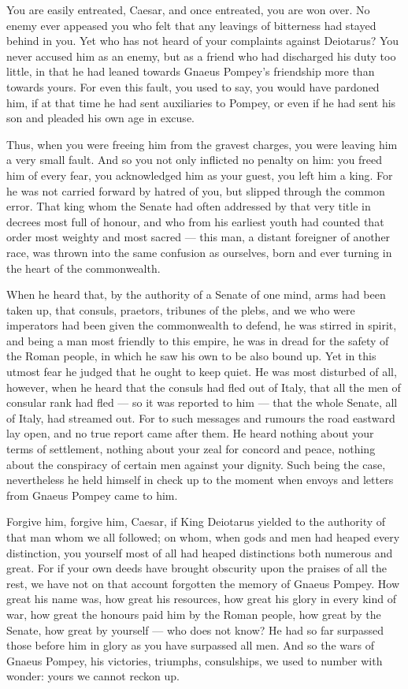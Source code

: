  You are easily entreated, Caesar, and once entreated, you are won over. No enemy ever appeased you who felt that any leavings of bitterness had stayed behind in you. Yet who has not heard of your complaints against Deiotarus? You never accused him as an enemy, but as a friend who had discharged his duty too little, in that he had leaned towards Gnaeus Pompey's friendship more than towards yours. For even this fault, you used to say, you would have pardoned him, if at that time he had sent auxiliaries to Pompey, or even if he had sent his son and pleaded his own age in excuse.

 Thus, when you were freeing him from the gravest charges, you were leaving him a very small fault. And so you not only inflicted no penalty on him: you freed him of every fear, you acknowledged him as your guest, you left him a king. For he was not carried forward by hatred of you, but slipped through the common error. That king whom the Senate had often addressed by that very title in decrees most full of honour, and who from his earliest youth had counted that order most weighty and most sacred --- this man, a distant foreigner of another race, was thrown into the same confusion as ourselves, born and ever turning in the heart of the commonwealth.

 When he heard that, by the authority of a Senate of one mind, arms had been taken up, that consuls, praetors, tribunes of the plebs, and we who were imperators had been given the commonwealth to defend, he was stirred in spirit, and being a man most friendly to this empire, he was in dread for the safety of the Roman people, in which he saw his own to be also bound up. Yet in this utmost fear he judged that he ought to keep quiet. He was most disturbed of all, however, when he heard that the consuls had fled out of Italy, that all the men of consular rank had fled --- so it was reported to him --- that the whole Senate, all of Italy, had streamed out. For to such messages and rumours the road eastward lay open, and no true report came after them. He heard nothing about your terms of settlement, nothing about your zeal for concord and peace, nothing about the conspiracy of certain men against your dignity. Such being the case, nevertheless he held himself in check up to the moment when envoys and letters from Gnaeus Pompey came to him.

 Forgive him, forgive him, Caesar, if King Deiotarus yielded to the authority of that man whom we all followed; on whom, when gods and men had heaped every distinction, you yourself most of all had heaped distinctions both numerous and great. For if your own deeds have brought obscurity upon the praises of all the rest, we have not on that account forgotten the memory of Gnaeus Pompey. How great his name was, how great his resources, how great his glory in every kind of war, how great the honours paid him by the Roman people, how great by the Senate, how great by yourself --- who does not know? He had so far surpassed those before him in glory as you have surpassed all men. And so the wars of Gnaeus Pompey, his victories, triumphs, consulships, we used to number with wonder: yours we cannot reckon up.

